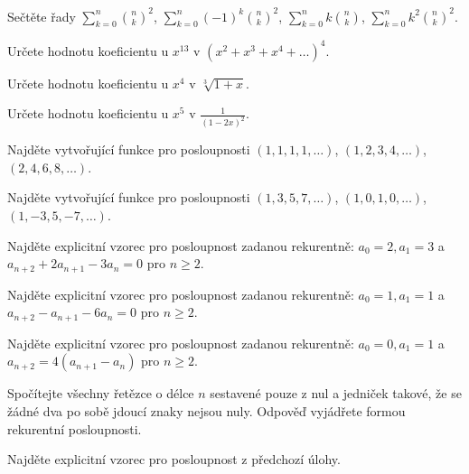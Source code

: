 \begin{t_exercise}
  \item Sečtěte řady $\sum_{k=0}^n \binom{n}{k}^2$, $\sum_{k=0}^n (-1)^k\binom{n}{k}^2$, $\sum_{k=0}^n k\binom{n}{k}$, $\sum_{k=0}^n k^2\binom{n}{k}^2$.
  \item Určete hodnotu koeficientu u $x^{13}$ v $(x^2+x^3+x^4+\dots)^4$.
  \item Určete hodnotu koeficientu u $x^4$ v $\sqrt[3]{1+x}$.
  \item Určete hodnotu koeficientu u $x^5$ v $\frac{1}{(1-2x)^2}$.
  \item Najděte vytvořující funkce pro posloupnosti $(1, 1, 1, 1, \dots)$, $(1, 2, 3, 4, \dots)$, $(2, 4, 6, 8, \dots)$.
  \item Najděte vytvořující funkce pro posloupnosti $(1, 3, 5, 7, \dots)$, $(1, 0, 1, 0, \dots)$, $(1, -3, 5, -7, \dots)$.
  \item Najděte explicitní vzorec pro posloupnost zadanou rekurentně: $a_0=2, a_1=3$ a $a_{n+2}+2a_{n+1}-3a_n=0$ pro $n\geq 2$.
  \item Najděte explicitní vzorec pro posloupnost zadanou rekurentně: $a_0=1, a_1=1$ a $a_{n+2}-a_{n+1}-6a_n=0$ pro $n\geq 2$.
  \item Najděte explicitní vzorec pro posloupnost zadanou rekurentně: $a_0=0, a_1=1$ a $a_{n+2}=4(a_{n+1}-a_n)$ pro $n\geq 2$.
  \item Spočítejte všechny řetězce o délce $n$ sestavené pouze z nul a jedniček takové, že se žádné dva po sobě jdoucí znaky nejsou nuly. Odpověď vyjádřete formou rekurentní posloupnosti.
  \item Najděte explicitní vzorec pro posloupnost z předchozí úlohy.
\end{t_exercise}
